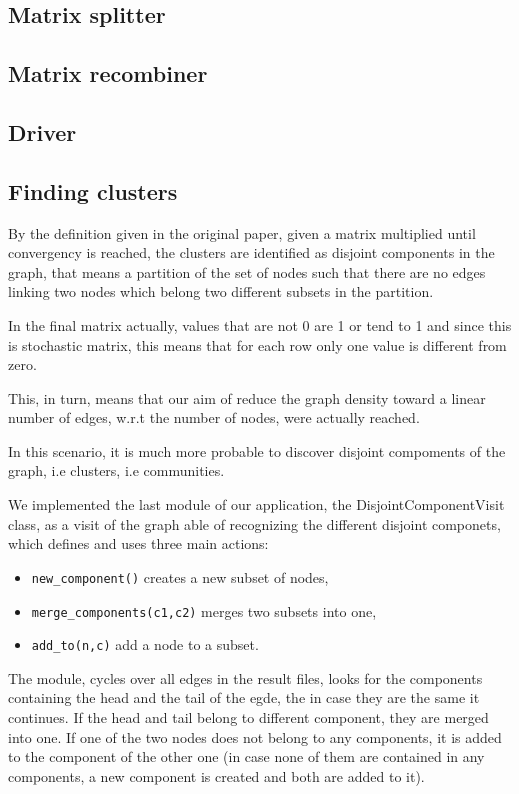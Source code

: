 \subsection{Matrix splitter}
\label{splitter}
\subsection{Matrix recombiner}
\label{recombiner}
\subsection{Driver}
\subsection{Finding clusters}

By the definition given in the original paper, given a matrix
multiplied until convergency is reached, the clusters are
identified as disjoint components in the graph, that means
a partition of the set of nodes such that there are no edges
linking two nodes which belong two different subsets in the partition.

In the  final matrix actually, values that are not 0 are 1 or tend to 1
and since this is stochastic matrix, this means that for each row
only one value is different from zero.

This, in turn, means that our aim of reduce the graph density toward
a linear number of edges, w.r.t the number of nodes, were  actually reached.

In this scenario, it is much more probable to discover disjoint compoments
of the graph, i.e clusters, i.e communities.

We implemented the last module of our application, the DisjointComponentVisit
class, as a visit
of the graph able of recognizing the different disjoint componets, which
defines and uses three main actions:
\begin{itemize}
    \item \verb!new_component()! creates a new subset of nodes,
    \item \verb!merge_components(c1,c2)! merges two subsets into one,
    \item \verb!add_to(n,c)! add a node to a subset.
\end{itemize}

The module, cycles over all edges in the result files, looks
for the components containing the head and the tail of the egde,
the in case they are the same it continues. If the head and tail
belong to different component, they are merged into one.
If one of the two nodes does not belong to any components, it is
added  to the component of the other one (in case none of them 
are contained in any components, a new component is created and both
are added to it).

